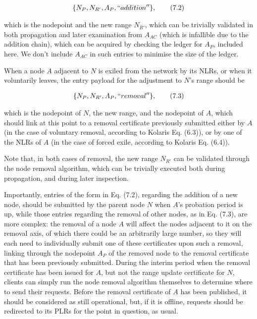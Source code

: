 \documentclass{extreport}
\begin{document}
\begin{align*}
\{ N_P, N_{R'}, A_P, ``addition'' \}, \tag{7.2}
\end{align*}

which is the nodepoint and the new range \(N_{R'}\), which can be trivially validated in both propagation and later examination from \(A_{AC}\) (which is infallible due to the addition chain), which can be acquired by checking the ledger for \(A_P\), included here. We don't include \(A_{AC}\) in such entries to minimise the size of the ledger.

When a node \(A\) adjacent to \(N\) is exiled from the network by its NLRs, or when it voluntarily leaves, the entry payload for the adjustment to \(N\)'s range should be

\begin{align*}
\{ N_P, N_{R'}, A_P, ``removal'' \}, \tag{7.3}
\end{align*}

which is the nodepoint of \(N\), the new range, and the nodepoint of \(A\), which should link at this point to a removal certificate previously submitted either by \(A\) (in the case of voluntary removal, according to Kolaris Eq. (6.3)), or by one of the NLRs of \(A\) (in the case of forced exile, according to Kolaris Eq. (6.4)).

Note that, in both cases of removal, the new range \(N_{R'}\) can be validated through the node removal algorithm, which can be trivially executed both during propagation, and during later inspection.

Importantly, entries of the form in Eq. (7.2), regarding the addition of a new node, should be submitted by the parent node \(N\) when \(A\)'s probation period is up, while those entries regarding the removal of other nodes, as in Eq. (7.3), are more complex: the removal of a node \(A\) will affect the nodes adjacent to it on the removal axis, of which there could be an arbitrarily large number, so they will each need to individually submit one of these certificates upon such a removal, linking through the nodepoint \(A_P\) of the removed node to the removal certificate that has been previously submitted. During the interim period when the removal certificate has been issued for \(A\), but not the range update certificate for \(N\), clients can simply run the node removal algorithm themselves to determine where to send their requests. Before the removal certificate of \(A\) has been published, it should be considered as still operational, but, if it is offline, requests should be redirected to its PLRs for the point in question, as usual.
\end{document}
